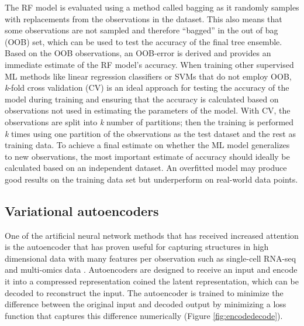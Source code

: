 \noindent
The RF model is evaluated using a method called bagging as it randomly samples with replacements from the observations in the dataset. This also means that some observations are not sampled and therefore “bagged” in the out of bag (OOB) set, which can be used to test the accuracy of the final tree ensemble. Based on the OOB observations, an OOB-error is derived and provides an immediate estimate of the RF model's accuracy. When training other supervised ML methods like linear regression classifiers or SVMs that do not employ OOB, \textit{k}-fold cross validation (CV) is an ideal approach for testing the accuracy of the model during training and ensuring that the accuracy is calculated based on observations not used in estimating the parameters of the model. With CV, the observations are split into \textit{k} number of partitions; then the training is performed \textit{k} times using one partition of the observations as the test dataset and the rest as training data. To achieve a final estimate on whether the ML model generalizes to new observations, the most important estimate of accuracy should ideally be calculated based on an independent dataset. An overfitted model may produce good results on the training data set but underperform on real-world data points.

\subsection{Variational autoencoders}

One of the artificial neural network methods that has received increased attention is the autoencoder that has proven useful for capturing structures in high dimensional data with many features per observation such as single-cell RNA-seq and multi-omics data \cite{Ma2019-mp,Wang2021-ne}. Autoencoders are designed to receive an input and encode it into a compressed representation coined the latent representation, which can be decoded to reconstruct the input. The autoencoder is trained to minimize the difference between the original input and decoded output by minimizing a loss function that captures this difference numerically (Figure \ref{fig:encodedecode}).

